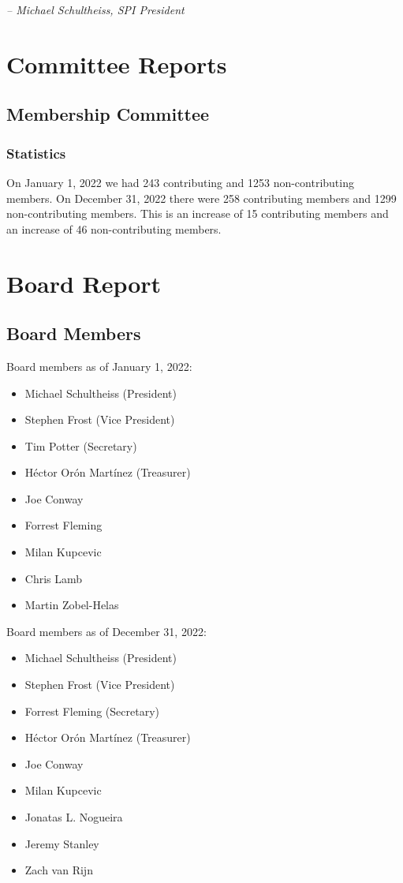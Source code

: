 \documentclass[a4paper]{report}
\begin{document}
  \emph{-- Michael Schultheiss, SPI President}

\newpage

\tableofcontents

\newpage

\chapter{Committee Reports}
\section{Membership Committee}

\subsection{Statistics}

On January 1, 2022 we had 243 contributing and 1253 non-contributing members.  On December 31, 2022 there were 258 contributing members and 1299 non-contributing members.  This is an increase of 15 contributing members and an increase of 46 non-contributing members.

\chapter{Board Report}
\section{Board Members}

Board members as of January 1, 2022:

\begin{itemize}
\item Michael Schultheiss (President)
\item Stephen Frost (Vice President)
\item Tim Potter (Secretary)
\item Héctor Orón Martínez (Treasurer)
\item Joe Conway
\item Forrest Fleming
\item Milan Kupcevic
\item Chris Lamb
\item Martin Zobel-Helas
\end{itemize}

Board members as of December 31, 2022:

\begin{itemize}
\item Michael Schultheiss (President)
\item Stephen Frost (Vice President)
\item Forrest Fleming (Secretary)
\item Héctor Orón Martínez (Treasurer)
\item Joe Conway
\item Milan Kupcevic
\item Jonatas L. Nogueira
\item Jeremy Stanley
\item Zach van Rijn
\end{itemize}
\end{document}
